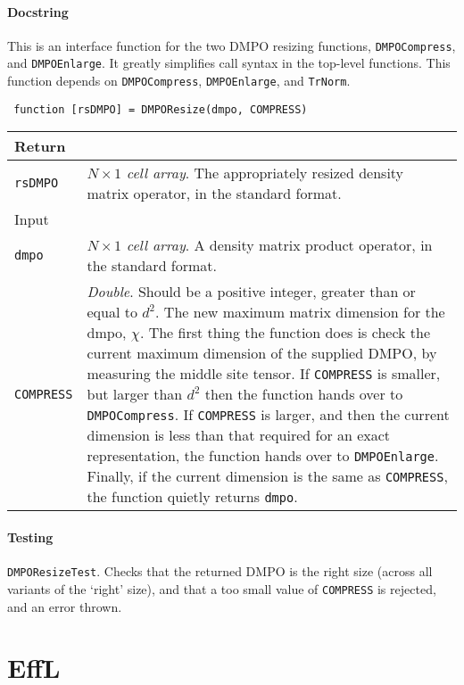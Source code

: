  \paragraph{Docstring} This is an interface function for the two DMPO resizing functions, \lstinline$DMPOCompress$, and \lstinline$DMPOEnlarge$. It greatly simplifies call syntax in the top-level functions. This function depends on \lstinline$DMPOCompress$, \lstinline$DMPOEnlarge$, and \lstinline$TrNorm$.
 \begin{lstlisting}
 function [rsDMPO] = DMPOResize(dmpo, COMPRESS) \end{lstlisting}
 \begin{longtabu}{X[1,1]X[4,1]}
 \hline
 Return & \\ \hline
 \lstinline$rsDMPO$ & \emph{\(N \times 1\) cell array}. The appropriately resized density matrix operator, in the standard format. \\ \hline
 Input & \\ \hline
 \lstinline$dmpo$ & \emph{\(N \times 1\) cell array}. A density matrix product operator, in the standard format. \\
 \lstinline$COMPRESS$ & \emph{Double}. Should be a positive integer, greater than or equal to \(d^{2}\). The new maximum matrix dimension for the dmpo, \(\chi\). The first thing the function does is check the current maximum dimension of the supplied DMPO, by measuring the middle site tensor. If \lstinline$COMPRESS$ is smaller, but larger than \(d^{2}\) then the function hands over to \lstinline$DMPOCompress$. If \lstinline$COMPRESS$ is larger, and then the current dimension is less than that required for an exact representation, the function hands over to \lstinline$DMPOEnlarge$. Finally, if the current dimension is the same as \lstinline$COMPRESS$, the function quietly returns \lstinline$dmpo$. \\
 \hline
 \end{longtabu}
 \paragraph{Testing} \lstinline$DMPOResizeTest$. Checks that the returned DMPO is the right size (across all variants of the `right' size), and that a too small value of \lstinline$COMPRESS$ is rejected, and an error thrown.

 \section{EffL}
